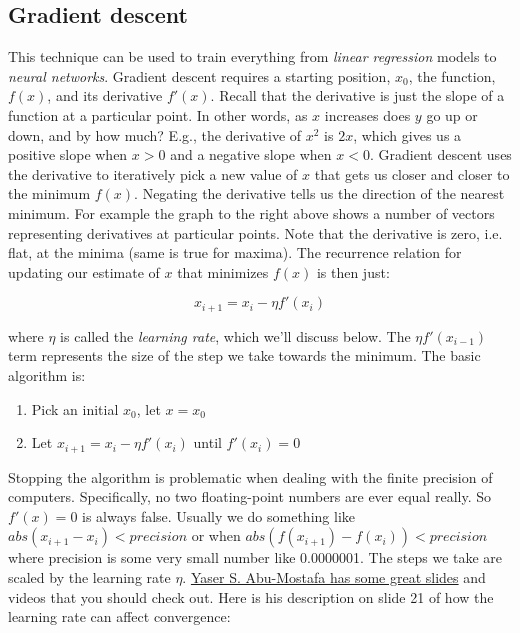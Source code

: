 \begin{fullwidth}
\subsection{Gradient descent}

This technique can be used to train everything from {\em linear regression} models to {\em neural networks}.  Gradient descent requires a starting position, $x_0$, the function, $f(x)$, and its derivative $f'(x)$.  Recall that the derivative is just the slope of a function at a particular point. In other words, as $x$ increases does $y$ go up or down, and by how much?  E.g., the derivative of $x^2$ is $2x$, which gives us a positive slope when $x>0$ and a negative slope when $x<0$.  Gradient descent uses the derivative to iteratively pick a new value of $x$ that gets us closer and closer to the minimum $f(x)$.  Negating the derivative tells us the direction of the nearest minimum. For example the graph to the right above shows a number of vectors representing derivatives at particular points. Note that the derivative is zero, i.e. flat, at the minima (same is true for maxima). The recurrence relation for updating our estimate of $x$ that minimizes $f(x)$ is then just:

\[
x_{i+1} = x_i - \eta f'(x_i)
\]

\noindent where $\eta$ is called the {\em learning rate}, which we'll discuss below. The $\eta f'(x_{i-1})$ term represents the size of the step we take towards the minimum. 
The basic algorithm is:

\begin{enumerate}
\item Pick an initial $x_0$, let $x = x_0$
\item Let $x_{i+1} = x_i - \eta f'(x_i)$ until $f'(x_i)=0$
\end{enumerate}

Stopping the algorithm is problematic when dealing with the finite precision of computers. Specifically, no two floating-point numbers are ever equal really. So $f'(x) = 0$ is always false. Usually we do something like $abs(x_{i+1} - x_i) < precision$ or when $abs(f(x_{i+1}) - f(x_i)) < precision$ where precision is some very small number like 0.0000001. The steps we take are scaled by the learning rate $\eta$.  \href{http://www.amlbook.com/slides/iTunesU_Lecture09_May_01.pdf}{Yaser S. Abu-Mostafa has some great slides} and videos that you should check out. Here is his description on slide 21 of how the learning rate can affect convergence:



\end{fullwidth}
